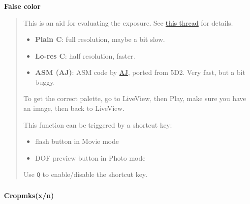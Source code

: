 \documentclass[a4paper,english]{article}
\begin{document}
\vspace{-10mm}\subsubsection*{}\label{false-color}
\textbf{False color}
%
\begin{quote}

This is an aid for evaluating the exposure. See \href{http://groups.google.com/group/ml-devel/browse_thread/thread/a5db0a709aa86767}{this thread} for details.
%
\begin{itemize}

\item \textbf{Plain C}: full resolution, maybe a bit slow.

\item \textbf{Lo-res C}: half resolution, faster.

\item \textbf{ASM (AJ)}: ASM code by \href{http://magiclantern.wikia.com/wiki/2.0.4_AJ}{AJ}, ported from 5D2. Very fast, but a bit buggy.

\end{itemize}

To get the correct palette, go to LiveView, then Play, make sure you have an image, then back to LiveView.

This function can be triggered by a shortcut key:
%
\begin{itemize}

\item flash button in Movie mode

\item DOF preview button in Photo mode

\end{itemize}

Use \texttt{Q} to enable/disable the shortcut key.

\end{quote}
\vspace{-10mm}\subsubsection*{}\label{cropmark}
\textbf{Cropmks(x/n)}
%
\end{document}
